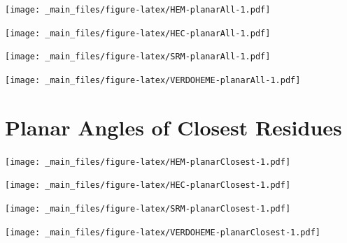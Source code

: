 \documentclass[a4paper, nobind]{templates/ociamthesis}
\let\origfigure\figure
\let\endorigfigure\endfigure
\renewenvironment{figure}[1][2] {
    \expandafter\origfigure\expandafter[H]
} {
    \endorigfigure
}
\begin{document}
\begin{figure}
\centering
\texttt{[image: \_main\_files/figure-latex/HEM-planarAll-1.pdf]}
\caption{\label{fig:HEM-planarAll}HEM: All Planar Angles}
\end{figure}

\begin{figure}
\centering
\texttt{[image: \_main\_files/figure-latex/HEC-planarAll-1.pdf]}
\caption{\label{fig:HEC-planarAll}HEC: All Planar Angles}
\end{figure}

\begin{figure}
\centering
\texttt{[image: \_main\_files/figure-latex/SRM-planarAll-1.pdf]}
\caption{\label{fig:SRM-planarAll}SRM: All Planar Angles}
\end{figure}

\begin{figure}
\centering
\texttt{[image: \_main\_files/figure-latex/VERDOHEME-planarAll-1.pdf]}
\caption{\label{fig:VERDOHEME-planarAll}VERDOHEME: All Planar Angles}
\end{figure}

\hypertarget{figs-planarClosest}{%
\section{Planar Angles of Closest Residues}\label{figs-planarClosest}}

\begin{figure}
\centering
\texttt{[image: \_main\_files/figure-latex/HEM-planarClosest-1.pdf]}
\caption{\label{fig:HEM-planarClosest}HEM: Planar Angles of Closest Residues}
\end{figure}

\begin{figure}
\centering
\texttt{[image: \_main\_files/figure-latex/HEC-planarClosest-1.pdf]}
\caption{\label{fig:HEC-planarClosest}HEC: Planar Angles of Closest Residues}
\end{figure}

\begin{figure}
\centering
\texttt{[image: \_main\_files/figure-latex/SRM-planarClosest-1.pdf]}
\caption{\label{fig:SRM-planarClosest}SRM: Planar Angles of Closest Residues}
\end{figure}

\begin{figure}
\centering
\texttt{[image: \_main\_files/figure-latex/VERDOHEME-planarClosest-1.pdf]}
\caption{\label{fig:VERDOHEME-planarClosest}VERDOHEME: Planar Angles of Closest Residues}
\end{figure}
\end{document}
